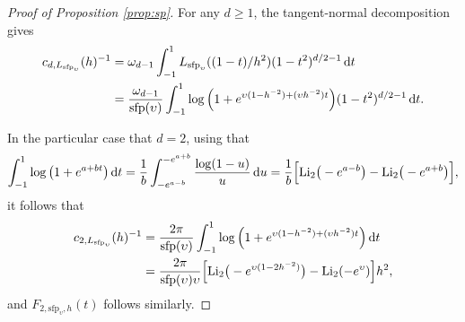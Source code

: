 \documentclass[oneside,11pt]{article}
\begin{document}
\begin{proof}[Proof of Proposition \ref{prop:sp}]
For any $d\geq1$, the tangent-normal decomposition gives
\begin{align*}
    c_{d,L_{\mathrm{sfp}_\upsilon}}(h)^{-1}&=\omega_{d-1}\int_{-1}^1L_{\mathrm{sfp}_\upsilon}((1-t)/h^2)(1-t^2)^{d/2-1}\,\mathrm{d} t\nonumber\\
    &=\frac{\omega_{d-1}}{\mathrm{sfp}(\upsilon)}\int_{-1}^1\log\Big(1+e^{\upsilon(1-h^{-2})+(\upsilon h^{-2})t}\Big) (1-t^2)^{d/2-1}\,\mathrm{d} t.
\end{align*}

In the particular case that $d=2$, using that
\begin{align}\label{eq:intlog}
    \int_{-1}^1 \log \big(1+e^{a+b t}\big) \,\mathrm{d} t
    =\frac{1}{b}\int_{-e^{a-b}}^{-e^{a+b}} \frac{\log (1-u)}{u} \,\mathrm{d} u
    =\frac{1}{b}\Big[\mathrm{Li}_{2}\big(-e^{a-b}\big)-\mathrm{Li}_{2}\big(-e^{a+b}\big)\Big],
\end{align}
it follows that
\begin{align*}
    c_{2,L_{\mathrm{sfp}_\upsilon}}(h)^{-1}&=\frac{2\pi}{\mathrm{sfp}(\upsilon)}\int_{-1}^1\log\Big(1+e^{\upsilon(1-h^{-2})+(\upsilon h^{-2})t}\Big)\,\mathrm{d} t\\
    &=\frac{2\pi}{\mathrm{sfp}(\upsilon)\upsilon}\Big[\mathrm{Li}_{2}\big(-e^{\upsilon(1-2h^{-2})}\big)-\mathrm{Li}_{2}(-e^{\upsilon})\Big]h^2,
\end{align*}
and $F_{2,\mathrm{sfp}_\upsilon,h}(t)$ follows similarly.
\end{proof}
\end{document}
